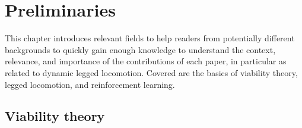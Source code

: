 
\chapter{Preliminaries} \label{chap:prelims}
This chapter introduces relevant fields to help readers from potentially different backgrounds to quickly gain enough knowledge to understand the context, relevance, and importance of the contributions of each paper, in particular as related to dynamic legged locomotion. Covered are the basics of viability theory, legged locomotion, and reinforcement learning.

\section{Viability theory}

